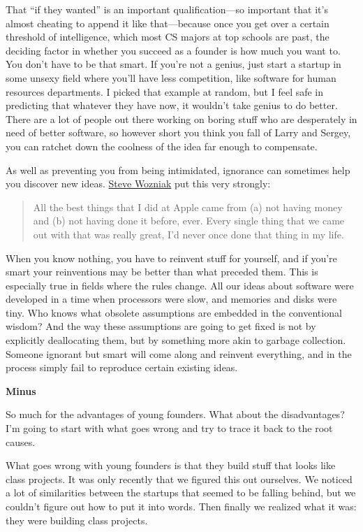 That ``if they wanted'' is an important qualification---so important
that it's almost cheating to append it like that---because once you get
over a certain threshold of intelligence, which most CS majors at top
schools are past, the deciding factor in whether you succeed as a
founder is how much you want to. You don't have to be that smart. If
you're not a genius, just start a startup in some unsexy field where
you'll have less competition, like software for human resources
departments. I picked that example at random, but I feel safe in
predicting that whatever they have now, it wouldn't take genius to do
better. There are a lot of people out there working on boring stuff who
are desperately in need of better software, so however short you think
you fall of Larry and Sergey, you can ratchet down the coolness of the
idea far enough to compensate.

As well as preventing you from being intimidated, ignorance can
sometimes help you discover new ideas.
\href{http://foundersatwork.com/stevewozniak.html}{Steve Wozniak} put
this very strongly:

\begin{quote}
All the best things that I did at Apple came from (a) not having money
and (b) not having done it before, ever. Every single thing that we came
out with that was really great, I'd never once done that thing in my
life.
\end{quote}

When you know nothing, you have to reinvent stuff for yourself, and if
you're smart your reinventions may be better than what preceded them.
This is especially true in fields where the rules change. All our ideas
about software were developed in a time when processors were slow, and
memories and disks were tiny. Who knows what obsolete assumptions are
embedded in the conventional wisdom? And the way these assumptions are
going to get fixed is not by explicitly deallocating them, but by
something more akin to garbage collection. Someone ignorant but smart
will come along and reinvent everything, and in the process simply fail
to reproduce certain existing ideas.

\textbf{Minus}

So much for the advantages of young founders. What about the
disadvantages? I'm going to start with what goes wrong and try to trace
it back to the root causes.

What goes wrong with young founders is that they build stuff that looks
like class projects. It was only recently that we figured this out
ourselves. We noticed a lot of similarities between the startups that
seemed to be falling behind, but we couldn't figure out how to put it
into words. Then finally we realized what it was: they were building
class projects.

